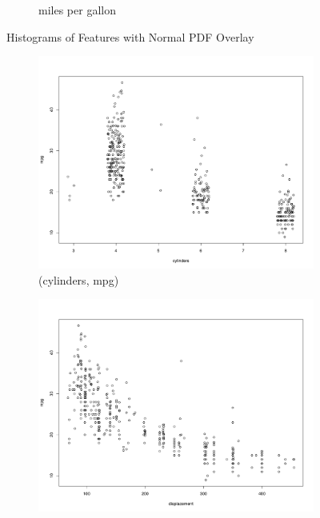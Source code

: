 \documentclass{homework}
\begin{document}
\begin{figure}[h]
\begin{subfigure}[b]{0.3\textwidth}
        \caption{miles per gallon}
        \label{fig:HP}
    \end{subfigure}
    \caption{Histograms of Features with Normal PDF Overlay}\label{fig:features}
\end{figure}

\question
\begin{figure}
\centering
    \begin{subfigure}[b]{0.3\textwidth}
        \includegraphics[width=\textwidth]{graphs/scatterCyl.pdf}
        \caption{(cylinders, mpg)}
        \label{fig:cylinder}
    \end{subfigure}
    \begin{subfigure}[b]{0.3\textwidth}
        \includegraphics[width=\textwidth]{graphs/scatterDis.pdf}

\end{subfigure}
\end{figure}
\end{document}
